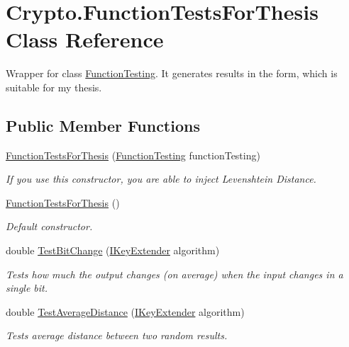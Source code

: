 \hypertarget{class_crypto_1_1_function_tests_for_thesis}{}\section{Crypto.\+Function\+Tests\+For\+Thesis Class Reference}
\label{class_crypto_1_1_function_tests_for_thesis}


Wrapper for class {\ttfamily \hyperlink{class_crypto_1_1_function_testing}{Function\+Testing}}. It generates results in the form, which is suitable for my thesis.  


\subsection*{Public Member Functions}
\begin{DoxyCompactItemize}
\item 
\hyperlink{class_crypto_1_1_function_tests_for_thesis_a06d8a9ea427bd3132909b7e20f949265}{Function\+Tests\+For\+Thesis} (\hyperlink{class_crypto_1_1_function_testing}{Function\+Testing} function\+Testing)
\begin{DoxyCompactList}\small\item\em If you use this constructor, you are able to inject Levenshtein Distance. \end{DoxyCompactList}\item 
\hyperlink{class_crypto_1_1_function_tests_for_thesis_a5111eb586e377ffc77887854a97a6e12}{Function\+Tests\+For\+Thesis} ()
\begin{DoxyCompactList}\small\item\em Default constructor. \end{DoxyCompactList}\item 
double \hyperlink{class_crypto_1_1_function_tests_for_thesis_ac1f19a5222e2ea9dd548115f5d27d625}{Test\+Bit\+Change} (\hyperlink{interface_crypto_1_1_i_key_extender}{I\+Key\+Extender} algorithm)
\begin{DoxyCompactList}\small\item\em Tests how much the output changes (on average) when the input changes in a single bit. \end{DoxyCompactList}\item 
double \hyperlink{class_crypto_1_1_function_tests_for_thesis_aa4c816a858cf43da9d4483b6b681b7e9}{Test\+Average\+Distance} (\hyperlink{interface_crypto_1_1_i_key_extender}{I\+Key\+Extender} algorithm)
\begin{DoxyCompactList}\small\item\em Tests average distance between two random results. \end{DoxyCompactList}\item 

\end{DoxyCompactItemize}
